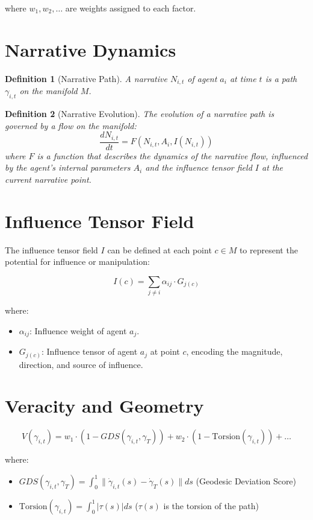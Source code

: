 \documentclass[12pt, a4paper]{article}
\newtheorem{definition}{Definition}
\begin{document}
where \( w_1, w_2, \dots \) are weights assigned to each factor.


\section{Narrative Dynamics}

\begin{definition}[Narrative Path]
A narrative \( N_{i,t} \) of agent \( a_i \) at time \( t \) is a path \( \gamma_{i,t} \) on the manifold \( M \).
\end{definition}

\begin{definition}[Narrative Evolution]
The evolution of a narrative path is governed by a flow on the manifold:
\begin{equation}
\frac{dN_{i,t}}{dt} = F(N_{i,t}, A_i, I(N_{i,t}))
\end{equation}
where \( F \) is a function that describes the dynamics of the narrative flow, influenced by the agent's internal parameters \( A_i \) and the influence tensor field \( I \) at the current narrative point.
\end{definition}

\section{Influence Tensor Field}

The influence tensor field \( I \) can be defined at each point \( c \in M \) to represent the potential for influence or manipulation:

\begin{equation}
I(c) = \sum_{j \neq i} \alpha_{ij} \cdot G_{j(c)}
\end{equation}

where:
\begin{itemize}
    \item \( \alpha_{ij} \): Influence weight of agent \( a_j \).
    \item \( G_{j(c)} \): Influence tensor of agent \( a_j \) at point \( c \), encoding the magnitude, direction, and source of influence.
\end{itemize}

\section{Veracity and Geometry}

\begin{equation}
V(\gamma_{i,t}) = w_1 \cdot (1 - GDS(\gamma_{i,t}, \gamma_T)) + w_2 \cdot (1 - \text{Torsion}(\gamma_{i,t})) + \dots
\end{equation}

where:
\begin{itemize}
    \item \( GDS(\gamma_{i,t}, \gamma_T) = \int_0^1 \| \dot{\gamma}_{i,t}(s) - \dot{\gamma}_T(s) \| ds \) (Geodesic Deviation Score)
    \item \( \text{Torsion}(\gamma_{i,t}) = \int_0^1 | \tau(s) | ds \) (\( \tau(s) \) is the torsion of the path)
\end{itemize}
\end{document}
